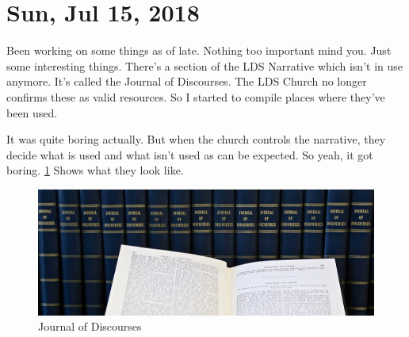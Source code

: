 \section{Sun, Jul 15, 2018}

Been working on some things as of late. Nothing too
important mind you. Just some interesting things. There's
a section of the LDS Narrative which isn't in use anymore.
It's called the Journal of Discourses. The LDS Church no
longer confirms these as valid resources. So I started to
compile places where they've been used.

It was quite boring actually. But when the church controls
the narrative, they decide what is used and what isn't used as
can be expected. So yeah, it got boring. \ref{fig:jod} Shows
what they look like.

\begin{figure}[h!]
  \centering
  \includegraphics[width=1.0\linewidth]{2018/images/jod.jpg}
  \caption{Journal of Discourses}
  \label{fig:jod}
\end{figure}